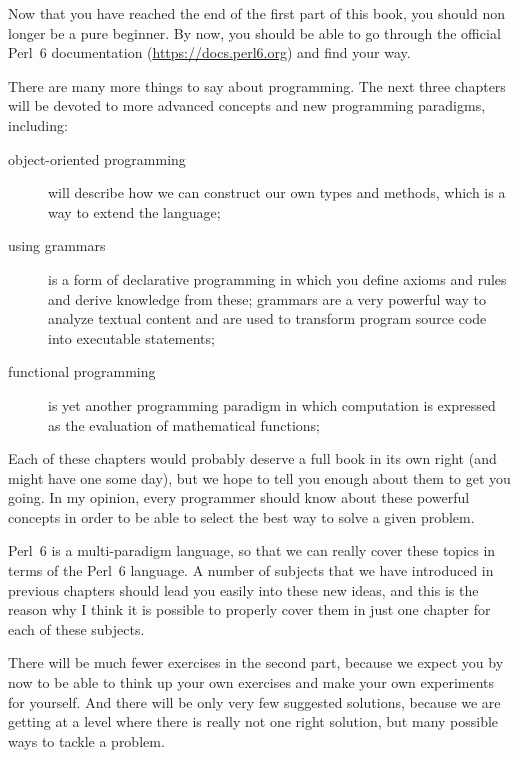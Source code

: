 %

Now that you have reached the end of the first part 
of this book, you should non longer be a pure beginner. 
By now, you should be able to go through the official 
Perl~6 documentation (\url{https://docs.perl6.org}) 
and find your way. 

There are many more things to say about programming. 
The next three chapters will be devoted to more 
advanced concepts and new programming paradigms, including:
\begin{description}

\item[object-oriented programming] will describe how 
we can construct our own types and methods, which 
is a way to extend the language;

\item[using grammars] is a form of declarative 
programming in which you define axioms and rules 
and derive knowledge from these; grammars are a 
very powerful way to analyze textual content and 
are used to transform program source code into 
executable statements;

\item[functional programming] is yet another programming 
paradigm in which computation is expressed as the 
evaluation of mathematical functions; 
\end{description}

Each of these chapters would probably deserve a full 
book in its own right (and might have one some day), 
but we hope to tell you enough about them to get you 
going. In my opinion, every programmer should know 
about these powerful concepts in order to be able 
to select the best way to solve a given problem.

Perl~6 is a multi-paradigm language, so that we can 
really cover these topics in terms of the Perl~6 
language. A number of subjects that we have 
introduced in previous chapters should lead you 
easily into these new ideas, and this is the 
reason why I think it is possible to properly cover 
them in just one chapter for each of these subjects.

There will be much fewer exercises in the second part, 
because we expect you by now to be able to think up 
your own exercises and make your own experiments for 
yourself. And there will be only very few suggested solutions, 
because we are getting at a level where there is really not  
one right solution, but many possible ways to tackle 
a problem.

